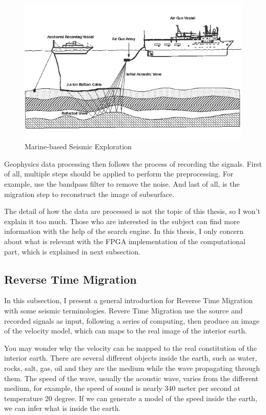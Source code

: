 \begin{figure}
  \centering
  \includegraphics[scale=0.5]{img/Seafloor_Seismic.png}
  \caption{Marine-based Seismic Exploration}
  \label{fig:sea_floor_seismic}
\end{figure}

Geophysics data processing then follows the process of recording the
signals. First of all, multiple steps should be applied to perform the
preprocessing. For example, use the bandpass filter to remove the noise.
And last of all, is the migration step to reconstruct the image of
subsurface.

The detail of how the data are processed is not the topic of this thesis,
so I won't explain it too much. Those who are interested in the subject can
find more information with the help of the search engine. In this thesis, I
only concern about what is relevant with the FPGA implementation of the
computational part, which is explained in next subsection.

\subsection{Reverse Time Migration}

In this subsection, I present a general introduction for Reverse Time
Migration with some seismic terminologies. Revere Time Migration use the
source and recorded signals as input, following a series of computing, then
produce an image of the velocity model, which can maps to the real image of
the interior earth.

You may wonder why the velocity can be mapped to the real constitution of
the interior earth. There are several different objects inside the earth,
such as water, rocks, salt, gas, oil and they are the medium while the wave
propagating through them. The speed of the wave, usually the acoustic wave,
varies from the different medium, for example, the speed of sound is nearly
340 meter per second at temperature 20 degree. If we can generate a model
of the speed inside the earth, we can infer what is inside the earth.

